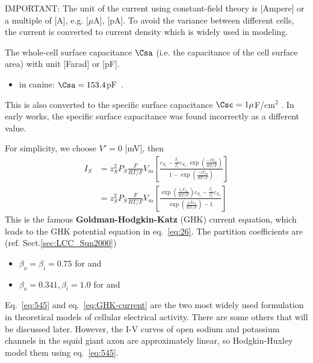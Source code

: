 \begin{mdframed}
  IMPORTANT: The unit of the current using constant-field theory is
  [Ampere] or a multiple of [A], e.g. [$\mu$A], [pA]. To avoid the variance
  between different cells, the current is converted to current density
  which is widely used in modeling.

The whole-cell surface capacitance $\Csa$
  (i.e. the capacitance of the cell surface area) with unit [Farad] or [pF].
  \begin{itemize}
  \item in canine: $\Csa=153.4$pF~\citep{greenstein2002}.
  \end{itemize}
This is also converted to the specific surface capacitance $\Csc=1\mu$F/cm$^2$
\citep{weidmann1970ect}. In early works, the specific surface capacitance was
found incorrectly as a different value.
\end{mdframed}



For simplicity, we choose $V'=0$ [mV], then
\begin{equation}
  \label{eq:544}
  \begin{split}
    I_S &= z_S^2 P_S\frac{F}{RT/F}V_m
    \left[\frac{c_{S_i}-\frac{\beta_o}{\beta_i}c_{S_o}.\exp\left(\frac{-zV_m}{RT/F}\right)}{1-\exp\left(\frac{-zV_m}{RT/F}\right)}
    \right] \\
    &= z_S^2 P_S\frac{F}{RT/F}V_m
    \left[\frac{\exp\left(\frac{z_sV_m}{RT/F}\right)c_{S_i}-\frac{\beta_o}{\beta_i}c_{S_o}}{\exp\left(\frac{z_sV_m}{RT/F}\right)
        - 1} \right]
  \end{split}
\end{equation}
This is the famous {\bf Goldman-Hodgkin-Katz} (GHK) current equation,
which leads to the GHK potential equation in eq.~\eqref{eq:26}. The
partition coefficients are~\citep{pitzer1973, lee1984, sun2000mlc}
(ref. Sect.\ref{sec:LCC_Sun2000})
\begin{itemize}
\item $\beta_o=\beta_i=0.75$ for  and 
\item $\beta_o=0.341, \beta_i=1.0$ for  and 
\end{itemize}


\begin{mdframed}

  Eq.~\eqref{eq:545} and eq.~\eqref{eq:GHK-current} are the two most widely
  used formulation in theoretical models of cellular electrical
  activity. There are some others that will be discussed
  later. However, the I-V curves of open sodium and potassium channels
  in the squid giant axon are approximately linear, so Hodgkin-Huxley
  model them using eq.~\eqref{eq:545}.
\end{mdframed}




